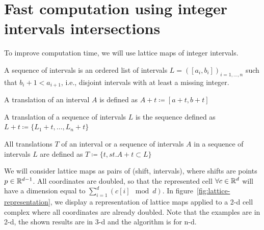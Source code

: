 \documentclass[runningheads]{llncs}
\begin{document}


    \section{Fast computation using integer intervals intersections}

    To improve computation time, we will use lattice maps of integer intervals.

    \begin{definition}
        A sequence of intervals is an ordered list of intervals $L = ([a_i,b_i])_{i=1,\ldots,n}$ such that $b_i + 1 < a_{i+1}$, i.e., disjoint intervals with at least a missing integer.
    \end{definition}

    \begin{definition}
        A translation of an interval $A$ is defined as $A+t \coloneqq [a+t, b+t]$
    \end{definition}

    \begin{definition}
        A translation of a sequence of intervals $L$ is the sequence defined as $L+t \coloneqq \{L_1+t,\ldots,L_n+t\}$
    \end{definition}

    \begin{definition}
        All translations $T$ of an interval or a sequence of intervals $A$ in a sequence of intervals $L$ are defined as $ T \coloneqq \{ t, st. A+t \subset L\}$
    \end{definition}

    We will consider lattice maps as pairs of (shift, intervals), where shifts are points $p \in \mathbb{R}^{d-1}$. All coordinates are doubled, so that the represented cell $\forall c \in \mathbb{R}^d$ will have a dimension equal to $\sum_{i=1}^d \left(c[i]\mod d\right)$.
    In figure~\ref{fig:lattice-representation}, we display a representation of lattice maps applied to a 2-d cell complex where all coordinates are already doubled. Note that the examples are in 2-d, the shown results are in 3-d and the algorithm is for n-d.
\end{document}
